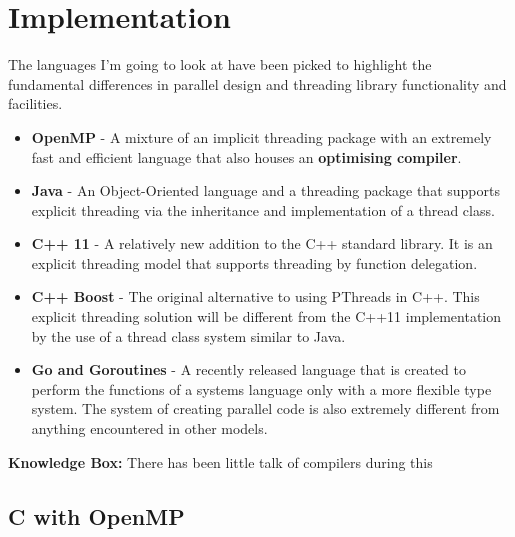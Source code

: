 \documentclass[11pt]{article} %
\begin{document}
\section{Implementation}
The languages I'm going to look at have been picked to highlight the fundamental differences in parallel design and threading library functionality and facilities. 
\begin{itemize}
\item {\bf OpenMP} - A mixture of an implicit threading package with an extremely fast and efficient language that also houses an {\bf optimising compiler}.
\item {\bf Java} - An Object-Oriented language and a threading package that supports explicit threading via the inheritance and implementation of a thread class.
\item {\bf C++ 11} - A relatively new addition to the C++ standard library. It is an explicit threading model that supports threading by function delegation.
\item {\bf C++ Boost} - The original alternative to using PThreads in C++. This explicit threading solution will be different from the C++11 implementation by the use of a thread class system similar to Java.
\item {\bf Go and Goroutines} - A recently released language that is created to perform the functions of a systems language only with a more flexible type system. The system of creating parallel code is also extremely different from anything encountered in other models.
\end{itemize}
\begin{mdframed}
{\bf Knowledge Box: } There has been little talk of compilers during this 
\end{mdframed}

\subsection{C with OpenMP}

\end{document}
